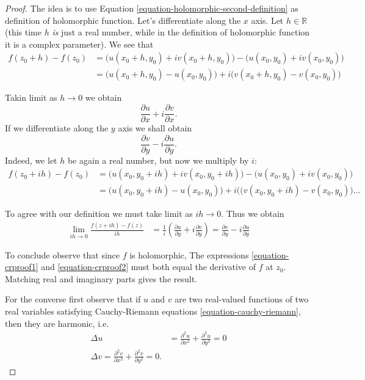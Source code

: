 \begin{proof}
The idea is to use Equation
\ref{equation-holomorphic-second-definition}
as definition of holomorphic function.
Let's differentiate along the $x$ axis.
Let $h \in \mathbb{R}$
(this time $h$ {\it is} just a real number,
while in the definition of holomorphic
function
it is a complex parameter).
We see that
$$
\begin{aligned}
f(z_0+h)-f(z_0)&=\Big(u(x_0+h,y_0)+iv(x_0+h,
y_0)\Big)-\Big(u(x_0,y_0)+iv(x_0,y_0)\Big)\\
&=\Big(u(x_0+h,y_0)-u(x_0,y_0)\Big)+
i\Big(v(x_0+h,y_0)-v(x_0,y_0)\Big)
\end{aligned}
$$

\noindent
Takin limit as $h \to 0$ we obtain
\begin{equation}
\label{equation-crproof1}
\frac{\partial u}{\partial x}+i\frac{\partial
v}{\partial x}.
\end{equation}
If we differentiate along the $y$ axis we
shall obtain
\begin{equation}
\label{equation-crproof2}
\frac{\partial v}{\partial y}-i\frac{\partial
u}{\partial y}.
\end{equation}
Indeed, we let $h$ be again a real number,
but now we multiply by $i$:
$$
\begin{aligned}
f(z_0+ih)-f(z_0)&=\Big(u(x_0,y_0+ih)+iv(x_0,
y_0+ih)\Big)-\Big(u(x_0,y_0)+iv(x_0,y_0)\Big)
\\
&=\Big(u(x_0,y_0+ih)-u(x_0,y_0)\Big)+
i\Big((v(x_0,y_0+ih)-v(x_0,y_0)\Big)\ldots
\end{aligned}
$$

\noindent
To agree with our definition we must take
limit as $ih \to 0$.
Thus we obtain
$$
\begin{aligned}
\lim_{ih \to 0}\frac{f(z+ih)-f(z)}{ih}
&=\frac{1}{i}\left(\frac{\partial u}{\partial
y}+i\frac{\partial v}{\partial y}\right)
=\frac{\partial v}{\partial
y}-i\frac{\partial u}{\partial y}
\end{aligned}
$$

\noindent
To conclude observe that since $f$ is
holomorphic,
The expressions \ref{equation-crproof1} and
\ref{equation-crproof2}
must both equal the derivative of $f$ at
$z_0$.
Matching real and imaginary parts gives the
result.

\medskip\noindent
For the converse first observe that if $u$
and $v$
are two real-valued functions of two real
variables
satisfying Cauchy-Riemann equations
\ref{equation-cauchy-riemann},
then they are harmonic, i.e.
$$
\begin{aligned}
\Delta u&=\frac{\partial^2 u}{\partial x^2}+
\frac{\partial^2 u}{\partial y^2}=0\\
\Delta v=\frac{\partial^2 v}{\partial x^2}+
\frac{\partial^2v}{\partial y^2}=0.
\end{aligned}
$$


\end{proof}
